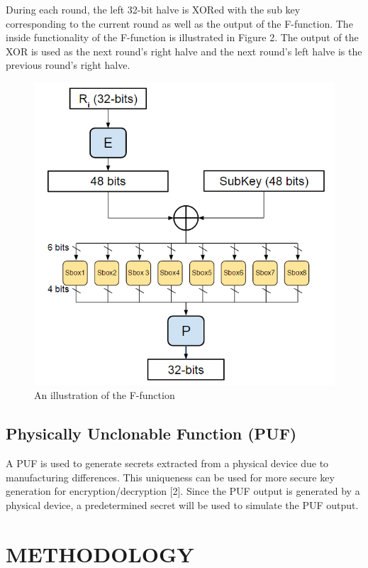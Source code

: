\documentclass[letterpaper, 10 pt, conference]{ieeeconf}  %
\begin{document}
During each round, the left 32-bit halve is XORed with the sub key corresponding to the current round as well as the output of the F-function.  The inside functionality of the F-function is illustrated in Figure 2. The output of the XOR is used as the next round's right halve and the next round's left halve is the previous round's right halve.

\begin{figure}[thpb]
	\centering
	\includegraphics[scale=.50]{Ffunction}
    \caption{An illustration of the F-function}
\end{figure}


\subsection{Physically Unclonable Function (PUF)}

A PUF is used to generate secrets extracted from a physical device due to manufacturing differences. This uniqueness can be used for more secure key generation for encryption/decryption [2]. Since the PUF output is generated by a physical device, a predetermined secret will be used to simulate the PUF output. 

\section{METHODOLOGY}
\end{document}
